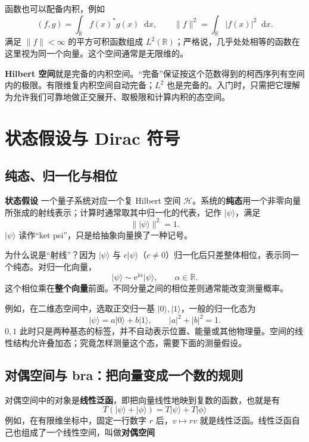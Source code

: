 \documentclass[a4paper,11pt]{article}
\numberwithin{equation}{section}
\newcommand{\ii}{\mathrm{i}}
\newcommand{\dd}{\mathop{}\!\mathrm{d}}
\newcommand{\ee}{\mathrm{e}}
\newcommand{\HH}{\mathcal H}
\newcommand{\ket}[1]{\lvert #1\rangle}
\newcommand{\norm}[1]{\lVert #1\rVert}
\newcommand{\abs}[1]{\lvert #1\rvert}
\newcommand{\important}[1]{\par\noindent\textbf{#1}\quad}
\begin{document}
函数也可以配备内积，例如
\begin{equation}
  (f,g)=\int_{\mathbb R}f(x)^*g(x)\dd x,
  \qquad \norm{f}^2=\int_{\mathbb R}\abs{f(x)}^2\dd x.
\end{equation}
满足 $\norm{f}<\infty$ 的平方可积函数组成 $L^2(\mathbb R)$；严格说，几乎处处相等的函数在这里视为同一个向量。这个空间通常是无限维的。

\textbf{Hilbert 空间}就是完备的内积空间。“完备”保证按这个范数得到的柯西序列有空间内的极限。有限维复内积空间自动完备；$L^2$ 也是完备的。入门时，只需把它理解为允许我们可靠地做正交展开、取极限和计算内积的态空间。

\section{状态假设与 Dirac 符号}
\subsection{纯态、归一化与相位}
\important{状态假设}
一个量子系统对应一个复 Hilbert 空间 $\HH$。系统的\textbf{纯态}用一个非零向量所张成的射线表示；计算时通常取其中归一化的代表，记作 $\ket{\psi}$，满足
\begin{equation}
  \norm{\ket{\psi}}^2=1.
\end{equation}
$\ket{\psi}$ 读作“ket psi”，只是给抽象向量换了一种记号。

为什么说是“射线”？因为 $\ket{\psi}$ 与 $c\ket{\psi}$（$c\neq0$）归一化后只差整体相位，表示同一个纯态。对归一化向量，
\begin{equation}
  \ket{\psi}\sim\ee^{\ii\alpha}\ket{\psi},\qquad \alpha\in\mathbb R.
\end{equation}
这个相位乘在\textbf{整个向量}前面。不同分量之间的相位差则通常能改变测量概率。

例如，在二维态空间中，选取正交归一基 $\ket{0},\ket{1}$，一般的归一化态为
\begin{equation}\label{eq:qubit}
  \ket{\psi}=a\ket{0}+b\ket{1},\qquad \abs{a}^2+\abs{b}^2=1.
\end{equation}
$0,1$ 此时只是两种基态的标签，并不自动表示位置、能量或其他物理量。空间的线性结构允许叠加态；究竟怎样测量这个态，需要下面的测量假设。

\subsection{对偶空间与 bra：把向量变成一个数的规则}
对偶空间中的对象是\textbf{线性泛函}，即把向量线性地映到复数的函数，也就是有
\begin{equation}
    T(\ket{\psi}+\ket{\phi})=T\ket{\psi}+T\ket{\phi}
\end{equation}
例如，在有限维坐标中，固定一行数字 $r$ 后，$v\mapsto rv$ 就是线性泛函。线性泛函自己也组成了一个线性空间，叫做\textbf{对偶空间}
\end{document}

